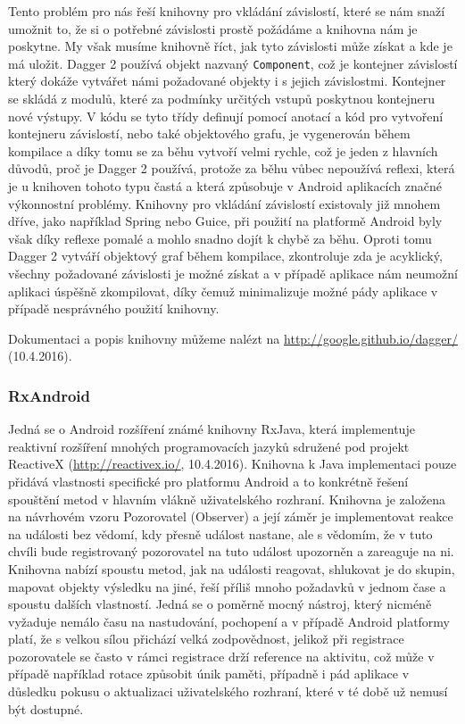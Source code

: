 \documentclass[czech,master,public,dept460,male,java,cpdeclaration]{diploma}
\begin{document}
Tento problém pro nás řeší knihovny pro vkládání závislostí, které se nám snaží umožnit to, že si o potřebné
závislosti prostě požádáme a knihovna nám je poskytne. My však musíme knihovně říct, jak tyto závislosti může
získat a kde je má uložit. Dagger 2 používá objekt nazvaný \texttt{Component}, což je kontejner závislostí
který dokáže vytvářet námi požadované objekty i s jejich závislostmi. Kontejner se skládá z modulů, které
za podmínky určitých vstupů poskytnou kontejneru nové výstupy. V kódu se tyto třídy definují pomocí anotací
a kód pro vytvoření kontejneru závislostí, nebo také objektového grafu, je vygenerován během kompilace
a díky tomu se za běhu vytvoří velmi rychle, což je jeden z hlavních důvodů, proč je Dagger 2 používá,
protože za běhu vůbec nepoužívá reflexi, která je u knihoven tohoto typu častá a která způsobuje v Android
aplikacích značné výkonnostní problémy. Knihovny pro vkládání závislostí existovaly již mnohem dříve,
jako například Spring nebo Guice, při použití na platformě Android byly však díky reflexe pomalé a mohlo snadno
dojít k chybě za běhu. Oproti tomu Dagger 2 vytváří objektový graf během kompilace, zkontroluje zda je acyklický,
všechny požadované závislosti je možné získat a v případě aplikace nám neumožní aplikaci úspěšně zkompilovat,
díky čemuž minimalizuje možné pády aplikace v případě nesprávného použití knihovny.

Dokumentaci a popis knihovny můžeme nalézt na \url{http://google.github.io/dagger/}  (10.4.2016).

\subsubsection{RxAndroid}\label{rxandroid}
Jedná se o Android rozšíření známé knihovny RxJava, která implementuje reaktivní rozšíření
mnohých programovacích jazyků sdružené pod projekt ReactiveX (\url{http://reactivex.io/}, 10.4.2016).
Knihovna k Java implementaci pouze přidává vlastnosti specifické pro platformu Android a to konkrétně
řešení spouštění metod v hlavním vlákně uživatelského rozhraní. Knihovna je založena na návrhovém
vzoru Pozorovatel (Observer) a její záměr je implementovat reakce na události bez vědomí, kdy přesně
událost nastane, ale s vědomím, že v tuto chvíli bude registrovaný pozorovatel na tuto událost
upozorněn a zareaguje na ni. Knihovna nabízí spoustu metod, jak na události reagovat, shlukovat je do
skupin, mapovat objekty výsledku na jiné, řeší příliš mnoho požadavků v jednom čase a spoustu dalších vlastností.
Jedná se o poměrně mocný nástroj, který nicméně vyžaduje nemálo času na nastudování, pochopení a v případě
Android platformy platí, že s velkou sílou přichází velká zodpovědnost, jelikož při registrace pozorovatele
se často v rámci registrace drží reference na aktivitu, což může v případě například rotace způsobit únik paměti,
případně i pád aplikace v důsledku pokusu o aktualizaci uživatelského rozhraní, které v té době už nemusí být dostupné.
\end{document}

